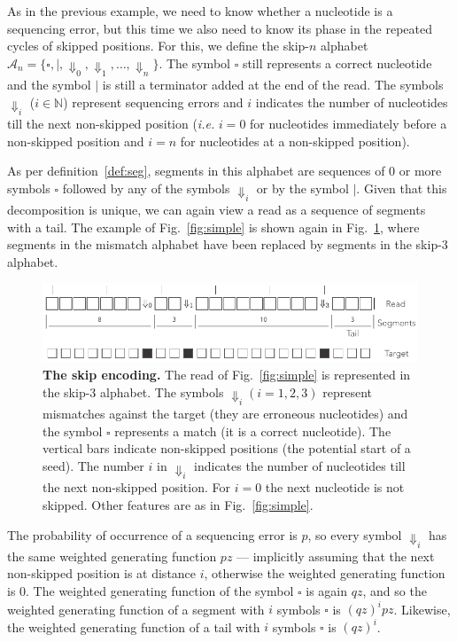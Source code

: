 \documentclass{article}
\begin{document}
As in the previous example, we need to know whether a nucleotide is a
sequencing error, but this time we also need to know its phase in the
repeated cycles of skipped positions. For this, we define the skip-$n$
alphabet $\mathcal{A}_n = \{\square, |, \Downarrow_0, \Downarrow_1,
\ldots, \Downarrow_n \}$. The symbol $\square$ still represents a correct
nucleotide and the symbol $|$ is still a terminator added at the end of
the read. The symbols $\Downarrow_i$ ($i \in \mathbb{N}$) represent
sequencing errors and $i$ indicates the number of nucleotides till the
next non-skipped position (\textit{i.e.} $i=0$ for nucleotides immediately
before a non-skipped position and $i=n$ for nucleotides at a non-skipped
position).

As per definition~\ref{def:seg}, segments in this alphabet are sequences
of 0 or more symbols $\square$ followed by any of the symbols
$\Downarrow_i$ or by the symbol $|$. Given that this decomposition is
unique, we can again view a read as a sequence of segments with a tail.
The example of Fig.~\ref{fig:simple} is shown again in
Fig.~\ref{fig:skip}, where segments in the mismatch alphabet have been
replaced by segments in the skip-3 alphabet.

\begin{figure}[h]
\centering
\includegraphics[scale=0.85]{sketch_skip.pdf}
\caption{\textbf{The skip encoding.}
The read of Fig.~\ref{fig:simple} is represented in the skip-3 alphabet.
The symbols $\Downarrow_i (i = 1,2,3)$ represent mismatches against the
target (they are erroneous nucleotides) and the symbol $\square$
represents a match (it is a correct nucleotide). The vertical bars
indicate non-skipped positions (the potential start of a seed). The number
$i$ in $\Downarrow_i$ indicates the number of nucleotides till the next
non-skipped position. For $i=0$ the next nucleotide is not skipped.
Other features are as in Fig.~\ref{fig:simple}.}
\label{fig:skip}
\end{figure}

The probability of occurrence of a sequencing error is $p$, so every
symbol $\Downarrow_i$ has the same weighted generating function $pz$ ---
implicitly assuming that the next non-skipped position is at distance $i$,
otherwise the weighted generating function is 0. The weighted generating
function of the symbol $\square$ is again $qz$, and so the weighted
generating function of a segment with $i$ symbols $\square$ is $(qz)^ipz$.
Likewise, the weighted generating function of a tail with $i$ symbols
$\square$ is $(qz)^i$.
\end{document}
